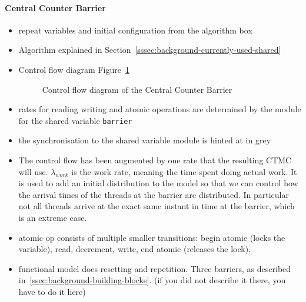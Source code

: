 \documentclass[a4paper, 10pt]{article}
\begin{document}
\paragraph{Central Counter Barrier}
\label{sssec:analysis-modelchecking-modelling-central-counter}
\begin{itemize}
	\item repeat variables and initial configuration from the algorithm box
	\item Algorithm explained in Section~\ref{sssec:background-currently-used-shared}
	\item Control flow diagram Figure~\ref{fig:model-central-counter}
		\begin{figure}[htbp]
			\centering
			
			\caption{Control flow diagram of the Central Counter Barrier}
			\label{fig:model-central-counter}
		\end{figure}
	\item rates for reading writing and atomic operations are determined by the module for the shared variable \texttt{barrier}
	\item the synchronisation to the shared variable module is hinted at in grey
	\item The control flow has been augmented by one rate that the resulting CTMC will use. $\lambda_{work}$ is the work rate, meaning the time spent doing actual work. It is used to add an initial distribution to the model so that we can control how the arrival times of the threads at the barrier are distributed. In particular not all threads arrive at the exact same instant in time at the barrier, which is an extreme case.
	\item atomic op consists of multiple smaller transitions: begin atomic (locks the variable), read, decrement, write, end atomic (releases the lock).
	\item functional model does resetting and repetition. Three barriers, as described in~\ref{ssec:background-building-blocks}. (if you did not describe it there, you have to do it here)
\end{itemize}

\end{document}
